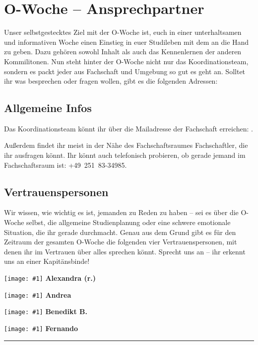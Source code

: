 \newcommand{\fibelvp}[2]{
	\minipage{0.24\textwidth}
		\begin{centering}
			\texttt{[image: \#1]}
			\textbf{#2}
		\end{centering}
	\endminipage\hfill
}

\section{O-Woche -- Ansprechpartner}

Unser selbstgestecktes Ziel mit der O-Woche ist, euch in einer unterhaltsamen und informativen Woche einen
Einstieg in euer Studileben mit dem an die Hand zu geben. Dazu gehören sowohl Inhalt als auch das Kennenlernen der
anderen Kommilitonen. Nun steht hinter der O-Woche nicht nur das Koordinationsteam, sondern es packt jeder
aus Fachschaft und Umgebung so gut es geht an. Solltet ihr was besprechen oder fragen wollen, gibt es die folgenden
Adressen:

\subsection{Allgemeine Infos}
Das Koordinationsteam könnt ihr über die Mailadresse der Fachschaft erreichen: .

Außerdem findet ihr meist in der Nähe des Fachschaftsraumes Fachschaftler, die ihr ausfragen könnt. Ihr könnt
auch telefonisch probieren, ob gerade jemand im Fachschaftsraum ist: +49~251~83-34985.

\subsection{Vertrauenspersonen}
Wir wissen, wie wichtig es ist, jemanden zu Reden zu haben -- sei es über die O-Woche selbst, die
allgemeine Studienplanung oder eine schwere emotionale Situation, die ihr gerade durchmacht. Genau aus dem Grund
gibt es für den Zeitraum der gesamten O-Woche die folgenden vier Vertrauenspersonen, mit denen ihr im Vertrauen über
alles sprechen könnt. Sprecht uns an -- ihr erkennt uns an einer Kapitänsbinde!

\fibelvp{res/vorstellungsfotos/simon_may_alexandra_everwand_edited_cropped.jpg}{Alexandra (r.)}
\fibelvp{res/vorstellungsfotos/andrea_garner_cropped.JPG}{Andrea}
\fibelvp{res/vorstellungsfotos/benedikt_bieringer.png}{Benedikt B.}
\fibelvp{res/vorstellungsfotos/fernando_romahn.png}{Fernando}

\rule{2cm}{0.4pt}

\fibelnotesimgsmall
